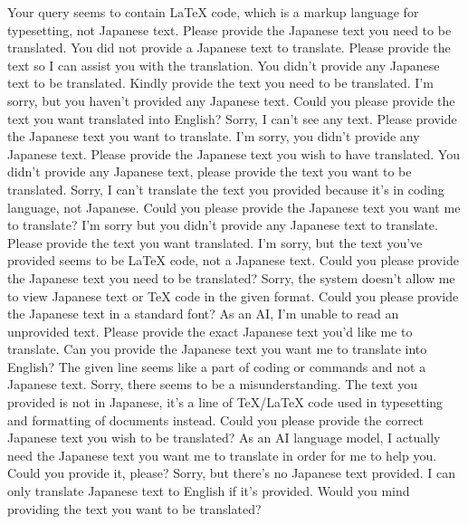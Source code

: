{%
Your query seems to contain LaTeX code, which is a markup language for typesetting, not Japanese text. Please provide the Japanese text you need to be translated.
You did not provide a Japanese text to translate. Please provide the text so I can assist you with the translation.
You didn't provide any Japanese text to be translated. Kindly provide the text you need to be translated.
I'm sorry, but you haven't provided any Japanese text. Could you please provide the text you want translated into English?
Sorry, I can't see any text. Please provide the Japanese text you want to translate.
I'm sorry, you didn't provide any Japanese text. Please provide the Japanese text you wish to have translated.
You didn't provide any Japanese text, please provide the text you want to be translated.
Sorry, I can't translate the text you provided because it's in coding language, not Japanese. Could you please provide the Japanese text you want me to translate?
I'm sorry but you didn't provide any Japanese text to translate. Please provide the text you want translated.
I'm sorry, but the text you've provided seems to be LaTeX code, not a Japanese text. Could you please provide the Japanese text you need to be translated?
Sorry, the system doesn't allow me to view Japanese text or TeX code in the given format. Could you please provide the Japanese text in a standard font?
As an AI, I'm unable to read an unprovided text. Please provide the exact Japanese text you'd like me to translate.
Can you provide the Japanese text you want me to translate into English? The given line seems like a part of coding or commands and not a Japanese text.
Sorry, there seems to be a misunderstanding. The text you provided is not in Japanese, it's a line of TeX/LaTeX code used in typesetting and formatting of documents instead. Could you please provide the correct Japanese text you wish to be translated?
As an AI language model, I actually need the Japanese text you want me to translate in order for me to help you. Could you provide it, please?
Sorry, but there's no Japanese text provided. I can only translate Japanese text to English if it's provided. Would you mind providing the text you want to be translated?
}
